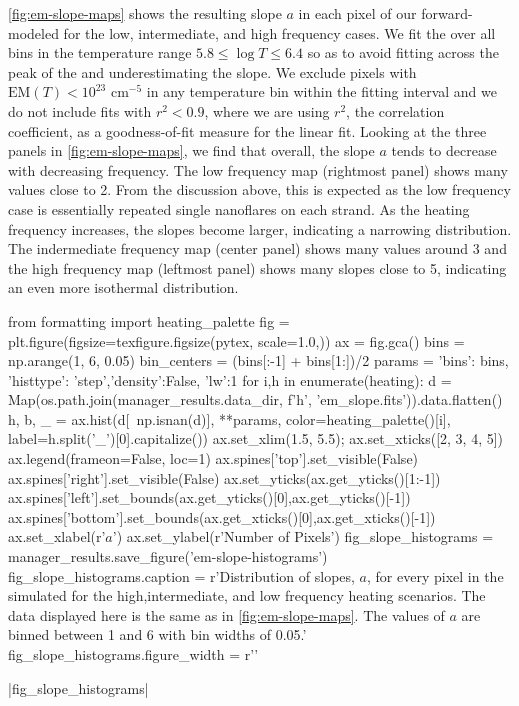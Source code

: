 \autoref{fig:em-slope-maps} shows the resulting \dem{} slope $a$ in each pixel of our forward-modeled \AR{} for the low, intermediate, and high frequency cases. We fit the \dem{} over all bins in the temperature range $5.8\le\log T\le6.4$ so as to avoid fitting across the peak of the \dem{} and underestimating the slope. We exclude pixels with $\mathrm{EM}(T)<10^{23}$ cm$^{-5}$ in any temperature bin within the fitting interval and we do not include fits with $r^2<0.9$, where we are using $r^2$, the correlation coefficient, as a goodness-of-fit measure for the linear fit. Looking at the three panels in \autoref{fig:em-slope-maps}, we find that overall, the \dem{} slope $a$ tends to decrease with decreasing frequency. The low frequency map (rightmost panel) shows many values close to 2. From the discussion above, this is expected as the low frequency case is essentially repeated single nanoflares on each strand. As the heating frequency increases, the slopes become larger, indicating a narrowing \dem{} distribution. The indermediate frequency map (center panel) shows many values around 3 and the high frequency map (leftmost panel) shows many slopes close to 5, indicating an even more isothermal distribution. 

\begin{pycode}
from formatting import heating_palette
fig = plt.figure(figsize=texfigure.figsize(pytex, scale=1.0,))
ax = fig.gca()
bins = np.arange(1, 6, 0.05)
bin_centers = (bins[:-1] + bins[1:])/2
params = {'bins': bins, 'histtype': 'step','density':False, 'lw':1}
for i,h in enumerate(heating):
    d = Map(os.path.join(manager_results.data_dir, f'{h}', 'em_slope.fits')).data.flatten()
    h, b, _ = ax.hist(d[~np.isnan(d)], **params, color=heating_palette()[i],
                      label=h.split('_')[0].capitalize())
ax.set_xlim(1.5, 5.5);
ax.set_xticks([2, 3, 4, 5])
ax.legend(frameon=False, loc=1)
ax.spines['top'].set_visible(False)
ax.spines['right'].set_visible(False)
ax.set_yticks(ax.get_yticks()[1:-1])
ax.spines['left'].set_bounds(ax.get_yticks()[0],ax.get_yticks()[-1])
ax.spines['bottom'].set_bounds(ax.get_xticks()[0],ax.get_xticks()[-1])
ax.set_xlabel(r'$a$')
ax.set_ylabel(r'Number of Pixels')
fig_slope_histograms = manager_results.save_figure('em-slope-histograms')
fig_slope_histograms.caption = r'Distribution of \dem{} slopes, $a$, for every pixel in the simulated \AR{} for the high,intermediate, and low frequency heating scenarios. The data displayed here is the same as in \autoref{fig:em-slope-maps}. The values of $a$ are binned between 1 and 6 with bin widths of 0.05.'
fig_slope_histograms.figure_width = r'\columnwidth' 
\end{pycode}
|fig_slope_histograms|

